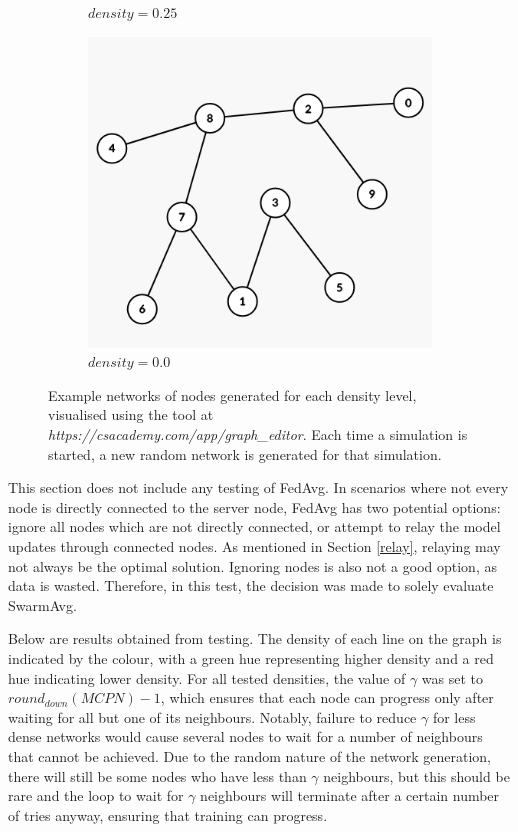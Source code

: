 \documentclass[letterpaper, 10 pt, conference]{ieeeconf}  %
\begin{document}
\begin{figure}[H]
\begin{subfigure}[b]{0.15\textwidth}
		\caption{$density=0.25$}
	\end{subfigure}
	\begin{subfigure}[b]{0.15\textwidth}
		\centering
		\includegraphics[width=\textwidth]{sparsegraph0}
		\caption{$density=0.0$}
	\end{subfigure}
	\caption{Example networks of nodes generated for each density level, visualised using the tool at \emph{https://csacademy.com/app/graph\_editor}. Each time a simulation is started, a new random network is generated for that simulation. \label{densefig}}
	{}\end{figure}


This section does not include any testing of FedAvg. In scenarios where not every node is directly connected to the server node, FedAvg has two potential options: ignore all nodes which are not directly connected, or attempt to relay the model updates through connected nodes. As mentioned in Section \ref{relay}, relaying may not always be the optimal solution. Ignoring nodes is also not a good option, as data is wasted. Therefore, in this test, the decision was made to solely evaluate SwarmAvg.

Below are results obtained from testing. The density of each line on the graph is indicated by the colour, with a green hue representing higher density and a red hue indicating lower density. For all tested densities, the value of $\gamma$ was set to $round_{down}(MCPN) - 1$, which ensures that each node can progress only after waiting for all but one of its neighbours. Notably, failure to reduce $\gamma$ for less dense networks would cause several nodes to wait for a number of neighbours that cannot be achieved. Due to the random nature of the network generation, there will still be some nodes who have less than $\gamma$ neighbours, but this should be rare and the loop to wait for $\gamma$ neighbours will terminate after a certain number of tries anyway, ensuring that training can progress.
\end{document}
